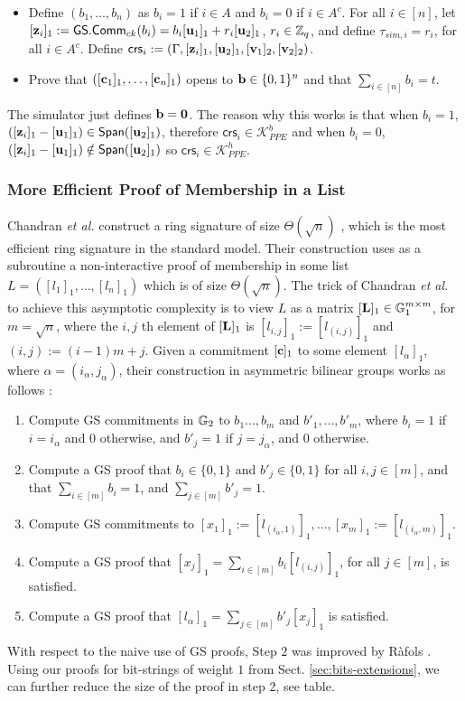 \begin{itemize}
\item Define $(b_1,\ldots,b_n)$ as $b_i=1$
if $i \in A$ and $b_i=0$ if $i \in A^c$. For all $i \in [n]$, let $[\mathbf{z}_i]_1:=\mathsf{GS.Comm}_{ck}(b_i)=b_i [\mathbf{u}_1]_1+ r_i [\mathbf{u}_2]_1$, $r_i \in \mathbb{Z}_q$, and define $\tau_{sim,i}=r_i$, for all $i \in A^c$. Define $\mathsf{crs}_i:=(\Gamma,[\mathbf{z}_i]_1,[\mathbf{u}_2]_1,[\mathbf{v}_1]_2,[\mathbf{v}_2]_2)$. 
\item Prove that $([\mathbf{c}_1]_1,\ldots,[\mathbf{c}_n]_1)$ opens to $\mathbf{b} \in \{0,1\}^{n}$ and that $\sum_{i\in[n]} b_i=t$.
\end{itemize}
The simulator just defines $\mathbf{b}=\mathbf{0}$. The reason why this works is that when $b_i=1$, $([\mathbf{z}_i]_1-[\mathbf{u}_1]_1) \in \mathsf{Span}( [\mathbf{u}_2]_1)$, therefore $\mathsf{crs}_i \in \mathcal{K}^{b}_{PPE}$ and when
$b_i=0$,  $([\mathbf{z}_i]_1-[\mathbf{u}_1]_1) \notin \mathsf{Span}( [\mathbf{u}_2]_1)$ so $\mathsf{crs}_i \in \mathcal{K}^{h}_{PPE}$.

\subsubsection{More Efficient Proof of Membership in a List} Chandran \textit{et al.} construct a ring signature of size $\Theta(\sqrt{n})$ \cite{ICALP:ChaGroSah07}, which is the most efficient ring signature in the standard model. Their construction uses as a subroutine a non-interactive proof of membership in some list $L=([l_1]_1,\ldots,[l_n]_1)$ which is of size $\Theta(\sqrt{n})$.  The trick of Chandran \textit{et al.} to achieve this asymptotic complexity is to view $L$ as a matrix $[\mathbf{{L}}]_1\in\mathbb{G}_1^{m\times m}$, for $m=\sqrt{n}$, where the $i,j$ th element of $[\mathbf{{L}}]_1$ is $[l_{i,j}]_1 := [l_{(i,j)}]_1$ and $(i,j):=(i-1)m+j$. Given a commitment $[\mathbf{c}]_1$ to some element $[l_{\alpha}]_1$, where $\alpha = (i_\alpha,j_\alpha)$, their construction in asymmetric bilinear groups works as follows :
\begin{enumerate}
\item Compute GS commitments in $\mathbb{G}_2$ to $b_1\ldots,b_m$ and $b'_1,\ldots,b'_m$,
      where $b_i = 1$ if $i=i_\alpha$ and $0$ otherwise, and $b'_{j}=1$ if $j=j_\alpha$, and $0$ otherwise.
\item Compute a GS proof that $b_i \in \{0,1\}$ and $b'_j \in \{0,1\}$ for all $i,j\in[m]$, and that $\sum_{i\in[m]}b_i=1$, and $\sum_{j\in[m]}b'_j=1$.
\item Compute GS commitments to $[x_1]_1:=[l_{(i_\alpha,1)}]_1,\ldots,[x_m]_1:=[l_{(i_\alpha,m)}]_1$.
\item Compute a GS proof that $[x_j]_1 = \sum_{i\in[m]}b_i[l_{(i,j)}]_1$, for all $j\in[m]$, is satisfied. 
\item Compute a GS proof that $[l_{\alpha}]_1 = \sum_{j\in[m]}b'_j[x_j]_1$ is satisfied.
\end{enumerate}
With respect to the naive use of GS proofs, Step $2$ was improved by R\`afols \cite{TCC:Rafols15}.  Using our proofs for bit-strings of weight $1$ from Sect. \ref{sec:bits-extensions}, we can further reduce the size of the proof in step 2, 
see table.

